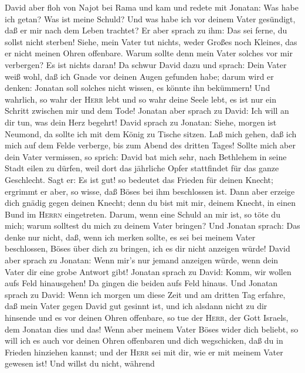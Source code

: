  David aber floh von Najot bei Rama und kam und redete mit
Jonatan: Was habe ich getan? Was ist meine Schuld? Und was habe ich vor
deinem Vater gesündigt, daß er mir nach dem Leben trachtet?
 Er aber sprach zu ihm: Das sei ferne, du sollst nicht
sterben! Siehe, mein Vater tut nichts, weder Großes noch Kleines, das er
nicht meinen Ohren offenbare. Warum sollte denn mein Vater solches vor
mir verbergen? Es ist nichts daran!  Da schwur David dazu
und sprach: Dein Vater weiß wohl, daß ich Gnade vor deinen Augen
gefunden habe; darum wird er denken: Jonatan soll solches nicht wissen,
es könnte ihn bekümmern! Und wahrlich, so wahr der \textsc{Herr} lebt
und so wahr deine Seele lebt, es ist nur ein Schritt zwischen mir und
dem Tode!  Jonatan aber sprach zu David: Ich will an dir
tun, was dein Herz begehrt!  David sprach zu Jonatan:
Siehe, morgen ist Neumond, da sollte ich mit dem König zu Tische sitzen.
Laß mich gehen, daß ich mich auf dem Felde verberge, bis zum Abend des
dritten Tages!  Sollte mich aber dein Vater vermissen, so
sprich: David bat mich sehr, nach Bethlehem in seine Stadt eilen zu
dürfen, weil dort das jährliche Opfer stattfindet für das ganze
Geschlecht.  Sagt er: Es ist gut! so bedeutet das Frieden
für deinen Knecht; ergrimmt er aber, so wisse, daß Böses bei ihm
beschlossen ist.  Dann aber erzeige dich gnädig gegen
deinen Knecht; denn du bist mit mir, deinem Knecht, in einen Bund im
\textsc{Herrn} eingetreten. Darum, wenn eine Schuld an mir ist, so töte
du mich; warum solltest du mich zu deinem Vater bringen? 
Und Jonatan sprach: Das denke nur nicht, daß, wenn ich merken sollte, es
sei bei meinem Vater beschlossen, Böses über dich zu bringen, ich es dir
nicht anzeigen würde!  David aber sprach zu Jonatan: Wenn
mir's nur jemand anzeigen würde, wenn dein Vater dir eine grobe Antwort
gibt!  Jonatan sprach zu David: Komm, wir wollen aufs
Feld hinausgehen! Da gingen die beiden aufs Feld hinaus. 
Und Jonatan sprach zu David: Wenn ich morgen um diese Zeit und am
dritten Tag erfahre, daß mein Vater gegen David gut gesinnt ist, und ich
alsdann nicht zu dir hinsende und es vor deinen Ohren offenbare,
 so tue der \textsc{Herr}, der Gott Israels, dem Jonatan
dies und das! Wenn aber meinem Vater Böses wider dich beliebt, so will
ich es auch vor deinen Ohren offenbaren und dich wegschicken, daß du in
Frieden hinziehen kannst; und der \textsc{Herr} sei mit dir, wie er mit
meinem Vater gewesen ist!  Und willst du nicht, während
